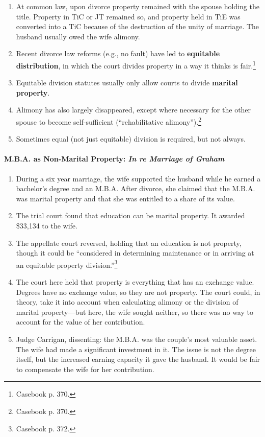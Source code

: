 \begin{enumerate}
    \item At common law, upon divorce property remained with the spouse 
    holding the title. Property in TiC or JT remained so, and property held in 
    TiE was converted into a TiC because of the destruction of the unity of 
    marriage. The husband usually owed the wife alimony.
    \item Recent divorce law reforms (e.g., no fault) have led to 
    \textbf{equitable distribution}, in which the court divides property in a 
    way it thinks is fair.\footnote{Casebook p. 370.}
    \item Equitable division statutes usually only allow courts to divide 
    \textbf{marital property}.
    \item Alimony has also largely disappeared, except where necessary for the 
    other spouse to become self-sufficient (``rehabilitative 
    alimony'').\footnote{Casebook p. 370.}
    \item Sometimes equal (not just equitable) division is required, but not 
    always.
\end{enumerate}

\paragraph{M.B.A. as Non-Marital Property: \emph{In re Marriage of Graham}}

\begin{enumerate}
    \item During a six year marriage, the wife supported the husband while he 
    earned a bachelor's degree and an M.B.A. After divorce, she claimed that 
    the M.B.A. was marital property and that she was entitled to a share of 
    its value.
    \item The trial court found that education can be marital property. It 
    awarded \$33,134 to the wife.
    \item The appellate court reversed, holding that an education is not 
    property, though it could be ``considered in determining maintenance or in 
    arriving at an equitable property division.''\footnote{Casebook p. 372.}
    \item The court here held that property is everything that has an exchange 
    value. Degrees have no exchange value, so they are not property. The court 
    could, in theory, take it into account when calculating alimony or the 
    division of marital property---but here, the wife sought neither, so there 
    was no way to account for the value of her contribution.
    \item Judge Carrigan, dissenting: the M.B.A. was the couple's most 
    valuable asset. The wife had made a significant investment in it. The 
    issue is not the degree itself, but the increased earning capacity it gave 
    the husband. It would be fair to compensate the wife for her contribution.
\end{enumerate}

